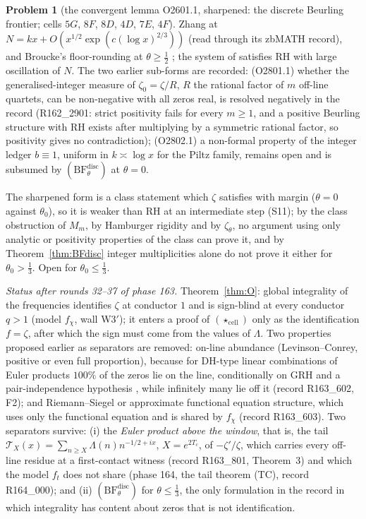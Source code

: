 \documentclass[11pt]{amsart}
\theoremstyle{definition}
\newtheorem{problem}{Problem}
\theoremstyle{remark}
\begin{document}
\begin{problem}[the convergent lemma O2601.1, sharpened: the discrete Beurling frontier; cells $5G$, $8F$, $8D$, $4D$, $7E$, $4F$]
Zhang at $N=kx+O(x^{1/2}\exp(c(\log x)^{2/3}))$ \cite{Zhang2007} (read through its zbMATH record), and Broucke's
floor-rounding at $\theta\ge\frac12$ \cite[Thm.~6.3]{Broucke2024}; the system of \cite{BDV2020} satisfies RH with
large oscillation of $N$. The two earlier sub-forms are recorded: (O2801.1) whether the generalised-integer measure of
$\zeta_0=\zeta/R$, $R$ the rational factor of $m$ off-line quartets, can be non-negative with all zeros real, is
resolved negatively in the record (R162\_2901: strict positivity fails for every $m\ge1$, and a positive Beurling
structure with RH exists after multiplying by a symmetric rational factor, so positivity gives no contradiction);
(O2802.1) a non-formal property of the integer ledger $b\equiv1$, uniform in $k\asymp\log x$ for the Piltz family,
remains open and is subsumed by $(\mathrm{BF}^{\mathrm{disc}}_\theta)$ at $\theta=0$.
\end{problem}
\noindent The sharpened form is a class statement which $\zeta$ satisfies with margin ($\theta=0$ against
$\theta_0$), so it is weaker than RH at an intermediate step (S11); by the class obstruction of $M_m$, by
Hamburger rigidity and by $\zeta_\theta$, no argument using only analytic or positivity properties of the class can
prove it, and by Theorem~\ref{thm:BFdisc} integer multiplicities alone do not prove it either for $\theta_0>\frac13$. Open for $\theta_0\le\frac13$.

\noindent\emph{Status after rounds 32--37 of phase 163.} Theorem~\ref{thm:O}: global integrality of the frequencies
identifies $\zeta$ at conductor $1$ and is sign-blind at every conductor $q>1$ (model $f_\chi$, wall W3$'$); it enters a
proof of $(\star_{\mathrm{cell}})$ only as the identification $f=\zeta$, after which the sign must come from the values of
$\Lambda$. Two properties proposed earlier as separators are removed: on-line abundance (Levinson--Conrey, positive or even
full proportion), because for DH-type linear combinations of Euler products $100\%$ of the zeros lie on the line,
conditionally on GRH and a pair-independence hypothesis \cite{BombieriHejhal1995}, while infinitely many lie off it
\cite{KaczorowskiKulas2007,SaiasWeingartner2009} (record R163\_602, F2); and Riemann--Siegel or approximate functional equation structure, which uses only the functional equation and
is shared by $f_\chi$ (record R163\_603). Two separators survive: (i) the \emph{Euler product above the window}, that is, the
tail $\mathcal T_X(x)=\sum_{n\ge X}\Lambda(n)n^{-1/2+ix}$, $X=e^{2T_c}$, of $-\zeta'/\zeta$, which carries every off-line
residue at a first-contact witness (record R163\_801, Theorem~3) and which the model $f_t$ does not share (phase 164,
the tail theorem (TC), record R164\_000); and (ii) $(\mathrm{BF}^{\mathrm{disc}}_\theta)$ for $\theta\le\frac13$, the only
formulation in the record in which integrality has content about zeros that is not identification.
\end{document}
